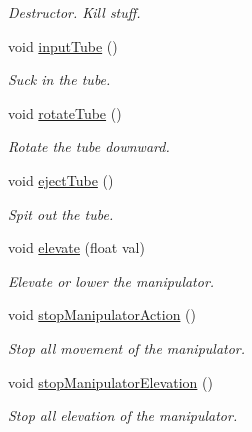 \begin{DoxyCompactItemize}
\begin{DoxyCompactList}\small\item\em Destructor. Kill stuff. \item\end{DoxyCompactList}\item 
void \hyperlink{class_r_j_f_r_c2011_1_1_manipulator_a7aa0f040e138fa13c8aa7263a7c7bf44}{inputTube} ()
\begin{DoxyCompactList}\small\item\em Suck in the tube. \item\end{DoxyCompactList}\item 
void \hyperlink{class_r_j_f_r_c2011_1_1_manipulator_a0b575c08bbcc3f66c148ae4b159712fd}{rotateTube} ()
\begin{DoxyCompactList}\small\item\em Rotate the tube downward. \item\end{DoxyCompactList}\item 
void \hyperlink{class_r_j_f_r_c2011_1_1_manipulator_aa24b86401a78f668b41f74d2a64675e6}{ejectTube} ()
\begin{DoxyCompactList}\small\item\em Spit out the tube. \item\end{DoxyCompactList}\item 
void \hyperlink{class_r_j_f_r_c2011_1_1_manipulator_a3f3e7f01e2d55398625e16780aa0a8fd}{elevate} (float val)
\begin{DoxyCompactList}\small\item\em Elevate or lower the manipulator. \item\end{DoxyCompactList}\item 
void \hyperlink{class_r_j_f_r_c2011_1_1_manipulator_a45eb99830ea757af18a30bd0cf299290}{stopManipulatorAction} ()
\begin{DoxyCompactList}\small\item\em Stop all movement of the manipulator. \item\end{DoxyCompactList}\item 
void \hyperlink{class_r_j_f_r_c2011_1_1_manipulator_aec97a8d018374519863f8ac357cc694f}{stopManipulatorElevation} ()
\begin{DoxyCompactList}\small\item\em Stop all elevation of the manipulator. \item\end{DoxyCompactList}\item 

\end{DoxyCompactItemize}
